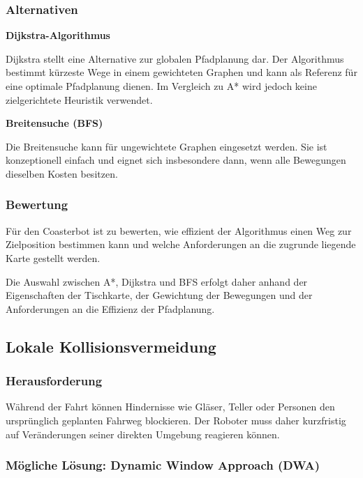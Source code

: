 \documentclass[
  a4paper,
  12pt,
  DIV=12,        %
  parskip=half,  %
  headings=small %
]{scrartcl}
\theoremstyle{definition}
\theoremstyle{definition}
\begin{document}
\subsubsection{Alternativen}\label{alternativen}

\textbf{Dijkstra-Algorithmus}

Dijkstra stellt eine Alternative zur globalen Pfadplanung dar. Der
Algorithmus bestimmt kürzeste Wege in einem gewichteten Graphen und kann
als Referenz für eine optimale Pfadplanung dienen. Im Vergleich zu A*
wird jedoch keine zielgerichtete Heuristik verwendet.

\textbf{Breitensuche (BFS)}

Die Breitensuche kann für ungewichtete Graphen eingesetzt werden. Sie
ist konzeptionell einfach und eignet sich insbesondere dann, wenn alle
Bewegungen dieselben Kosten besitzen.

\subsubsection{Bewertung}\label{bewertung}

Für den Coasterbot ist zu bewerten, wie effizient der Algorithmus einen
Weg zur Zielposition bestimmen kann und welche Anforderungen an die
zugrunde liegende Karte gestellt werden.

Die Auswahl zwischen A*, Dijkstra und BFS erfolgt daher anhand der
Eigenschaften der Tischkarte, der Gewichtung der Bewegungen und der
Anforderungen an die Effizienz der Pfadplanung.

\subsection{Lokale
Kollisionsvermeidung}\label{lokale-kollisionsvermeidung}

\subsubsection{Herausforderung}\label{herausforderung-1}

Während der Fahrt können Hindernisse wie Gläser, Teller oder Personen
den ursprünglich geplanten Fahrweg blockieren. Der Roboter muss daher
kurzfristig auf Veränderungen seiner direkten Umgebung reagieren können.

\subsubsection{Mögliche Lösung: Dynamic Window Approach
(DWA)}\label{muxf6gliche-luxf6sung-dynamic-window-approach-dwa}
\end{document}
